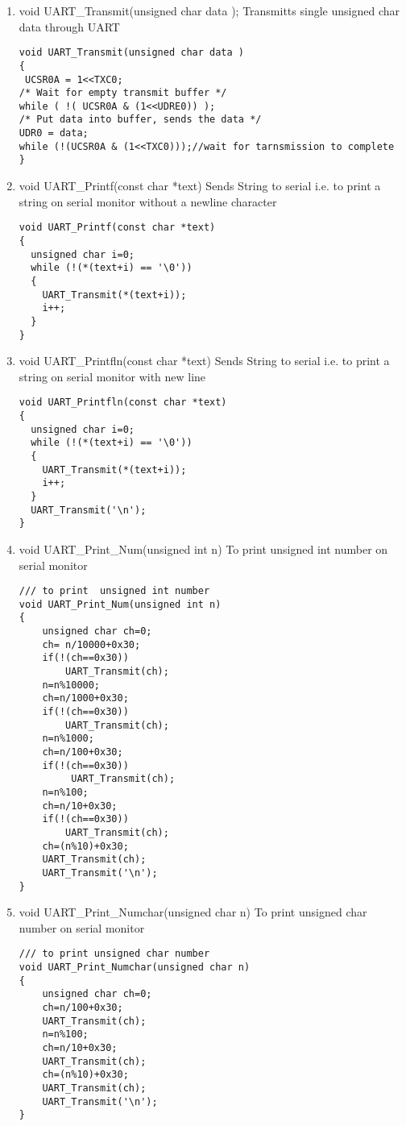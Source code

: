 \documentclass{article}
\begin{document}
\begin{itemize}
\begin{enumerate}
\begin{lstlisting}
\end{lstlisting}
\item void UART\_Transmit(unsigned char data );  
\newline  Transmitts single unsigned char data through UART
\begin{lstlisting}
void UART_Transmit(unsigned char data )
{
 UCSR0A = 1<<TXC0;
/* Wait for empty transmit buffer */
while ( !( UCSR0A & (1<<UDRE0)) );
/* Put data into buffer, sends the data */
UDR0 = data;
while (!(UCSR0A & (1<<TXC0)));//wait for tarnsmission to complete
}
\end{lstlisting}
\item void UART\_Printf(const char *text) 
\newline Sends String to serial i.e. to print a string on serial monitor without a newline character
\begin{lstlisting}
void UART_Printf(const char *text)
{
  unsigned char i=0;
  while (!(*(text+i) == '\0'))
  {
    UART_Transmit(*(text+i));
    i++;
  } 
}
\end{lstlisting}
\item void UART\_Printfln(const char *text) 
\newline Sends String to serial i.e. to print a string on serial monitor with new line
\begin{lstlisting}
void UART_Printfln(const char *text)
{
  unsigned char i=0;
  while (!(*(text+i) == '\0'))
  {
    UART_Transmit(*(text+i));
    i++;
  } 
  UART_Transmit('\n');
}
\end{lstlisting}
\item void UART\_Print\_Num(unsigned int n)
\newline To print  unsigned int number on serial monitor
\begin{lstlisting}
/// to print  unsigned int number
void UART_Print_Num(unsigned int n)
{ 
	unsigned char ch=0;
	ch= n/10000+0x30;
	if(!(ch==0x30))
		UART_Transmit(ch);
	n=n%10000;
	ch=n/1000+0x30;
	if(!(ch==0x30))
		UART_Transmit(ch);
	n=n%1000;
	ch=n/100+0x30;
	if(!(ch==0x30))
		 UART_Transmit(ch);
	n=n%100;
	ch=n/10+0x30;
	if(!(ch==0x30))
		UART_Transmit(ch);
	ch=(n%10)+0x30;
    UART_Transmit(ch);	
    UART_Transmit('\n');	
}
\end{lstlisting}
\item void UART\_Print\_Numchar(unsigned char n)
\newline To print  unsigned char number on serial monitor
\begin{lstlisting}
/// to print unsigned char number
void UART_Print_Numchar(unsigned char n)
{
	unsigned char ch=0;
	ch=n/100+0x30;
	UART_Transmit(ch);
	n=n%100;
	ch=n/10+0x30;
	UART_Transmit(ch);
	ch=(n%10)+0x30;
	UART_Transmit(ch);
	UART_Transmit('\n');
}
\end{lstlisting}


\end{enumerate}
\end{itemize}
\end{document}
